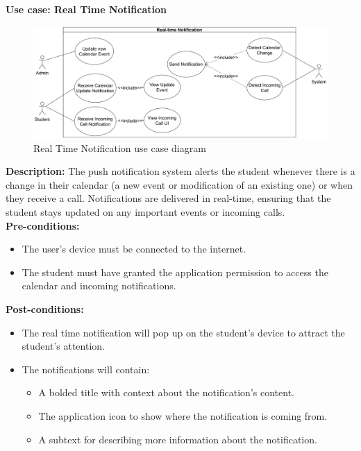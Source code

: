 \documentclass[12pt]{article}
\begin{document}
\pagebreak

\textbf{Use case: Real Time Notification} \\

    \begin{figure}[H]
        \centering
        \includegraphics[width=1\textwidth]{image/Real-timeNotificationUseCase.pdf} 
        \caption{Real Time Notification use case diagram}
        \label{fig:notification_usecase}
    \end{figure}
    \textbf{Description:} The push notification system alerts the student whenever there is a change in their calendar (a new event or modification of an existing one) or when they receive a call. Notifications are delivered in real-time, ensuring that the student stays updated on any important events or incoming calls. \\
    
    \noindent \textbf{Pre-conditions:} 
        \begin{itemize}
            \item The user’s device must be connected to the internet.
            \item The student must have granted the application permission to access the calendar and incoming notifications.
        \end{itemize}
    \noindent \textbf{Post-conditions:}
    \begin{itemize}
        \item The real time notification will pop up on the student's device to attract the student's attention.
        \item The notifications will contain:
        \begin{itemize}
            \item A bolded title with context about the notification’s content.
            \item The application icon to show where the notification is coming from.
            \item A subtext for describing more information about the notification.
        \end{itemize}
    \end{itemize}
\end{document}
